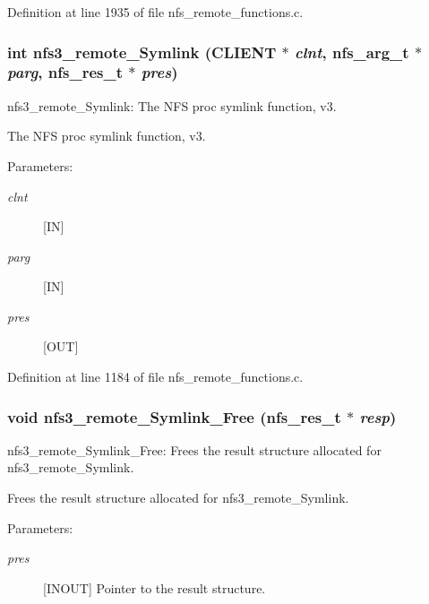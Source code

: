 Definition at line 1935 of file nfs\_\-remote\_\-functions.c.
\subsubsection[{nfs3\_\-remote\_\-Symlink}]{\setlength{\rightskip}{0pt plus 5cm}int nfs3\_\-remote\_\-Symlink (CLIENT $\ast$ {\em clnt}, \/  nfs\_\-arg\_\-t $\ast$ {\em parg}, \/  nfs\_\-res\_\-t $\ast$ {\em pres})}\label{group__NFSprocs_gcf367f6d49254f8156b0378a2789ea58}


nfs3\_\-remote\_\-Symlink: The NFS proc symlink function, v3.

The NFS proc symlink function, v3.

\begin{Desc}
\item[Parameters:]
\begin{description}
\item[{\em clnt}][IN] \item[{\em parg}][IN] \item[{\em pres}][OUT] \end{description}
\end{Desc}


Definition at line 1184 of file nfs\_\-remote\_\-functions.c.
\subsubsection[{nfs3\_\-remote\_\-Symlink\_\-Free}]{\setlength{\rightskip}{0pt plus 5cm}void nfs3\_\-remote\_\-Symlink\_\-Free (nfs\_\-res\_\-t $\ast$ {\em resp})}\label{group__NFSprocs_gcc972c9c7613f4dc1e430e069439974d}


nfs3\_\-remote\_\-Symlink\_\-Free: Frees the result structure allocated for nfs3\_\-remote\_\-Symlink.

Frees the result structure allocated for nfs3\_\-remote\_\-Symlink.

\begin{Desc}
\item[Parameters:]
\begin{description}
\item[{\em pres}][INOUT] Pointer to the result structure. \end{description}
\end{Desc}


